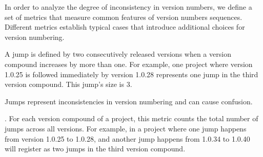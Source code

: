 \documentclass[conference]{IEEEtran}
\begin{document}








In order to analyze the degree of inconsistency in version numbers, we define 
a set of metrics that measure common features of version numbers sequences. Different metrics establish typical cases that introduce additional choices for version numbering. 
 
 
 
 
 A jump is defined by two consecutively released versions when a version compound increases by more than one.
For example, one project where version 1.0.25 is followed immediately by version 1.0.28 represents one jump in the third version compound. This jump's size is 3.

Jumps represent inconsistencies in version numbering and can cause confusion.
 
.  For each version compound of a project, this metric counts the total number of jumps across all versions. For example, in a project where one jump happens from version 1.0.25 to 1.0.28, and another jump happens from 1.0.34 to 1.0.40 will register as two jumps in the third version compound.\\
\end{document}
